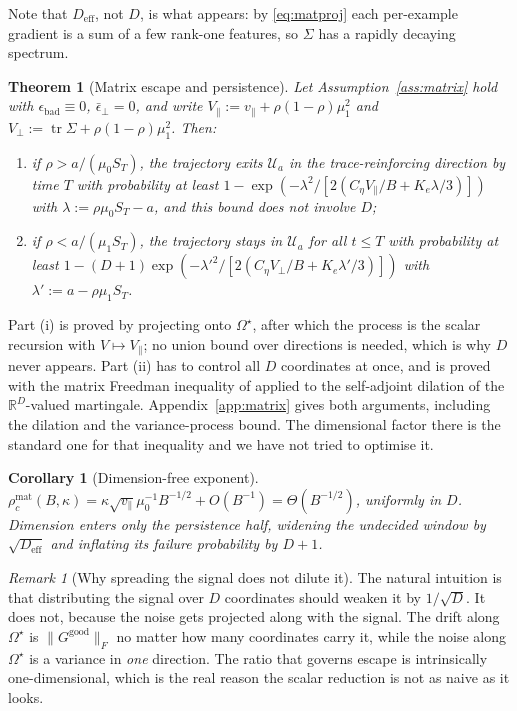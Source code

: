 \documentclass{article}
\theoremstyle{plain}
\newtheorem{theorem}{Theorem}
\newtheorem{corollary}{Corollary}
\theoremstyle{definition}
\theoremstyle{remark}
\newtheorem{remark}{Remark}
\newcommand{\R}{\mathbb{R}}
\newcommand{\1}{\mathbf{1}}
\newcommand{\cU}{\mathcal{U}}
\newcommand{\good}{\mathrm{good}}
\newcommand{\bad}{\mathrm{bad}}
\newcommand{\Tr}{\operatorname{tr}}
\newcommand{\Om}{\Omega}
\begin{document}
Note that $D_{\mathrm{eff}}$, not $D$, is what appears: by \eqref{eq:matproj}
each per-example gradient is a sum of a few rank-one features, so $\Sigma$ has a
rapidly decaying spectrum.

\begin{theorem}[Matrix escape and persistence]
\label{thm:matrixescape}
Let Assumption~\ref{ass:matrix} hold with
$\epsilon_\bad\equiv0$, $\bar\epsilon_\perp = 0$, and write
$V_\parallel := v_\parallel+\rho(1-\rho)\mu_1^2$ and
$V_\perp := \Tr\Sigma+\rho(1-\rho)\mu_1^2$. Then:
\begin{enumerate}[leftmargin=*,itemsep=2pt]
\item[(i)] if $\rho > a/(\mu_0S_T)$, the trajectory exits $\cU_a$ in the
trace-reinforcing direction by time $T$ with probability at least
$1-\exp(-\lambda^2/[2(C_\eta V_\parallel/B+K_e\lambda/3)])$ with
$\lambda := \rho\mu_0S_T-a$, and \emph{this bound does not involve $D$};
\item[(ii)] if $\rho < a/(\mu_1S_T)$, the trajectory stays in $\cU_a$ for all
$t\le T$ with probability at least
$1-(D+1)\exp(-\lambda'^2/[2(C_\eta V_\perp/B+K_e\lambda'/3)])$ with
$\lambda' := a-\rho\mu_1S_T$.
\end{enumerate}
\end{theorem}

Part (i) is proved by projecting onto $\Om^\star$, after which the process is the
scalar recursion with $V\mapsto V_\parallel$; no union bound over directions is
needed, which is why $D$ never appears. Part (ii) has to control all $D$
coordinates at once, and is proved with the matrix Freedman inequality of
\citet{tropp2011freedman} applied to the self-adjoint dilation of the
$\R^D$-valued martingale. Appendix~\ref{app:matrix} gives both arguments,
including the dilation and the variance-process bound. The dimensional factor
there is the standard one for that inequality and we have not tried to optimise
it.

\begin{corollary}[Dimension-free exponent]
\label{cor:dimfree}
$\rho_c^{\mathrm{mat}}(B,\kappa) = \kappa\sqrt{v_\parallel}\mu_0^{-1}B^{-1/2}
+O(B^{-1}) = \Theta(B^{-1/2})$, uniformly in $D$. Dimension enters only the
persistence half, widening the undecided window by $\sqrt{D_{\mathrm{eff}}}$ and
inflating its failure probability by $D+1$.
\end{corollary}

\begin{remark}[Why spreading the signal does not dilute it]
\label{rem:spread}
The natural intuition is that distributing the signal over $D$ coordinates should
weaken it by $1/\sqrt D$. It does not, because the noise gets projected along
with the signal. The drift along $\Om^\star$ is $\|G^\good\|_F$ no matter how
many coordinates carry it, while the noise along $\Om^\star$ is a variance in
\emph{one} direction. The ratio that governs escape is intrinsically
one-dimensional, which is the real reason the scalar reduction is not as naive as
it looks.
\end{remark}
\end{document}
